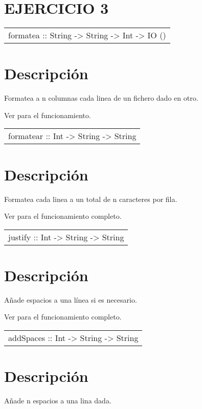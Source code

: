 \section{EJERCICIO 3}
\begin{haddockdesc}
\item[\begin{tabular}{@{}l}
formatea :: String -> String -> Int -> IO ()
\end{tabular}]
{\haddockbegindoc
\section*{Descripción}
Formatea a n columnas cada linea de un fichero dado en otro.\par
Ver  para el funcionamiento.\par}
\end{haddockdesc}
\begin{haddockdesc}
\item[\begin{tabular}{@{}l}
formatear :: Int -> String -> String
\end{tabular}]
{\haddockbegindoc
\section*{Descripción}
Formatea cada linea a un total de n caracteres por fila.\par
Ver  para el funcionamiento completo.\par}
\end{haddockdesc}
\begin{haddockdesc}
\item[\begin{tabular}{@{}l}
justify :: Int -> String -> String
\end{tabular}]
{\haddockbegindoc
\section*{Descripción}
Añade espacios a una línea si es necesario.\par
Ver  para el funcionamiento completo.\par}
\end{haddockdesc}
\begin{haddockdesc}
\item[\begin{tabular}{@{}l}
addSpaces :: Int -> String -> String
\end{tabular}]
{\haddockbegindoc
\section*{Descripción}
Añade n espacios a una lina dada.\par}
\end{haddockdesc}